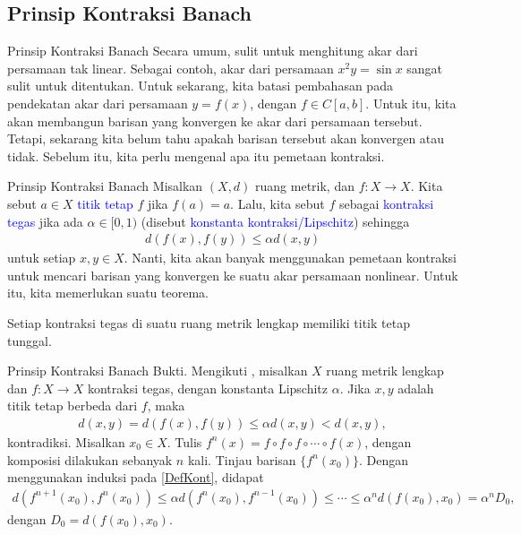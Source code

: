 \documentclass[xcolor={dvipsnames}, 9pt]{beamer}
\renewcommand{\emph}[1]{\textcolor{Blue}{#1}}
\begin{document}
	\subsection{Prinsip Kontraksi Banach}
	\begin{frame}{Prinsip Kontraksi Banach}
		Secara umum, sulit untuk menghitung akar dari persamaan tak linear. Sebagai contoh, akar dari persamaan $x^2y = \sin x$ sangat sulit untuk ditentukan. \newline
		Untuk sekarang, kita batasi pembahasan pada pendekatan akar dari persamaan $y=f(x)$, dengan $f\in C[a,b]$. \newline
		Untuk itu, kita akan membangun barisan yang konvergen ke akar dari persamaan tersebut. Tetapi, sekarang kita belum tahu apakah barisan tersebut akan konvergen atau tidak. Sebelum itu, kita perlu mengenal apa itu pemetaan kontraksi.
	\end{frame}
	\begin{frame}{Prinsip Kontraksi Banach}
		Misalkan $(X,d)$ ruang metrik, dan $f:X\to X$. Kita sebut $a\in X$ \emph{titik tetap} $f$ jika $f(a)=a$. Lalu, kita sebut $f$ sebagai \emph{kontraksi tegas} jika ada $\alpha\in[0,1)$ (disebut \emph{konstanta kontraksi/Lipschitz}) sehingga
		\begin{align}\label{DefKont}
			d(f(x),f(y))\leq\alpha d(x,y)
		\end{align}
		untuk setiap $x,y\in X$. \newline
		Nanti, kita akan banyak menggunakan pemetaan kontraksi untuk mencari barisan yang konvergen ke suatu akar persamaan nonlinear. Untuk itu, kita memerlukan suatu teorema.
		\begin{theorem}
			Setiap kontraksi tegas di suatu ruang metrik lengkap memiliki titik tetap tunggal.
		\end{theorem}
	\end{frame}
	\begin{frame}{Prinsip Kontraksi Banach}
		Bukti. Mengikuti \cite{Kainth2023Comprehensive}, misalkan $X$ ruang metrik lengkap dan $f:X\to X$ kontraksi tegas, dengan konstanta Lipschitz $\alpha$. \newline
		 Jika $x,y$ adalah titik tetap berbeda dari $f$, maka
		\begin{align*}
			d(x,y) = d(f(x),f(y)) \leq \alpha d(x,y) < d(x,y),
		\end{align*}
		kontradiksi. \newline
		 Misalkan $x_0\in X$. Tulis $f^n(x)=f\circ f\circ f\circ \cdots \circ f(x)$, dengan komposisi dilakukan sebanyak $n$ kali. Tinjau barisan $\{f^n(x_0)\}$. Dengan menggunakan induksi pada \eqref{DefKont}, didapat
		\begin{align*}
			d(f^{n+1}(x_0),f^n(x_0))\leq\alpha d(f^n(x_0),f^{n-1}(x_0))\leq\cdots\leq\alpha^nd(f(x_0),x_0)=\alpha^nD_0,
		\end{align*}
		dengan $D_0=d(f(x_0),x_0)$. 
	\end{frame}
\end{document}
